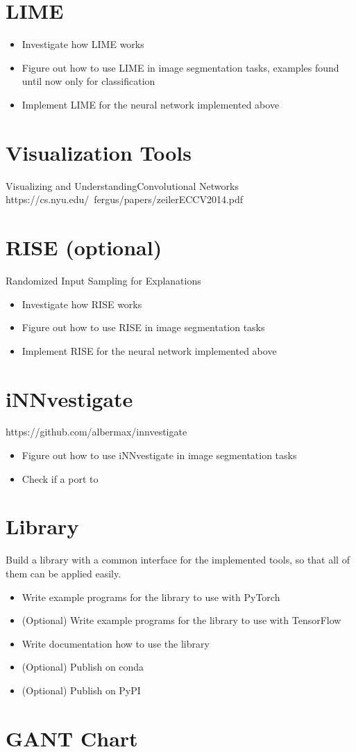 \section{LIME}
\begin{itemize}
    \item Investigate how LIME works
    \item Figure out how to use LIME in image segmentation tasks, examples found until now only for classification
    \item Implement LIME for the neural network implemented above
\end{itemize}

\section{Visualization Tools}
Visualizing and UnderstandingConvolutional Networks
https://cs.nyu.edu/~fergus/papers/zeilerECCV2014.pdf


\section{RISE (optional)}
Randomized Input Sampling for Explanations
\begin{itemize}
    \item Investigate how RISE works
    \item Figure out how to use RISE in image segmentation tasks
    \item Implement RISE for the neural network implemented above
\end{itemize}

\section{iNNvestigate}
https://github.com/albermax/innvestigate

\begin{itemize}
    \item Figure out how to use iNNvestigate in image segmentation tasks
    \item Check if a port to 
\end{itemize}

\section{Library}
Build a library with a common interface for the implemented tools, so that all of them can be applied easily.
\begin{itemize}
    \item Write example programs for the library to use with PyTorch
    \item (Optional) Write example programs for the library to use with TensorFlow
    \item Write documentation how to use the library
    \item (Optional) Publish on conda
    \item (Optional) Publish on PyPI
    
\end{itemize}

\section{GANT Chart}
